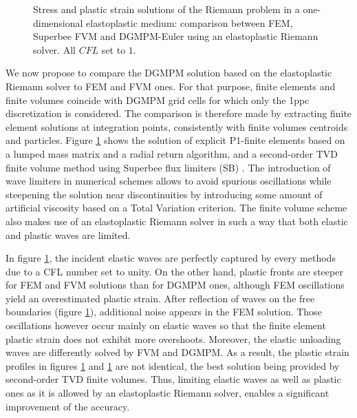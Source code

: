 \begin{figure}[h!]
  \centering
  { \label{subfig:ep_dgmpm_fvm1}}
  { \label{subfig:ep_dgmpm_fvm3}}
  {}
  \caption{Stress and plastic strain solutions of the Riemann problem in a one-dimensional elastoplastic medium: comparison between FEM, Superbee FVM and DGMPM-Euler using an elastoplastic Riemann solver. All $CFL$ set to $1$.}
  \label{fig:RP_EP_dgmpm_fvm}
\end{figure}


We now propose to compare the DGMPM solution based on the elastoplastic Riemann solver to FEM and FVM ones.
For that purpose, finite elements and finite volumes coincide with DGMPM grid cells for which only the 1ppc discretization is considered.
The comparison is therefore made by extracting finite element solutions at integration points, consistently with finite volumes centroids and particles.
Figure \ref{fig:RP_EP_dgmpm_fvm} shows the solution of explicit P1-finite elements based on a lumped mass matrix and a radial return algorithm, and a second-order TVD finite volume method using Superbee flux limiters (SB) \cite{Thomas_EP}.
The introduction of wave limiters in numerical schemes allows to avoid spurious oscillations while steepening the solution near discontinuities by introducing some amount of artificial viscosity based on a Total Variation criterion.
The finite volume scheme also makes use of an elastoplastic Riemann solver in such a way that both elastic and plastic waves are limited.

In figure \ref{fig:RP_EP_dgmpm_fvm}, the incident elastic waves are perfectly captured by every methods due to a CFL number set to unity.
On the other hand, plastic fronts are steeper for FEM and FVM solutions than for DGMPM ones, although FEM oscillations yield an overestimated plastic strain. 
After reflection of waves on the free boundaries (figure \ref{fig:RP_EP_dgmpm_fvm}), additional noise appears in the FEM solution.
Those oscillations however occur mainly on elastic waves so that the finite element plastic strain does not exhibit more overshoots.
Moreover, the elastic unloading waves are differently solved by FVM and DGMPM.
As a result, the plastic strain profiles in figures \ref{fig:RP_EP_dgmpm_fvm} and \ref{fig:RP_EP_dgmpm_fvm} are not identical, the best solution being provided by second-order TVD finite volumes. %
Thus, limiting elastic waves as well as plastic ones as it is allowed by an elastoplastic Riemann solver, enables a significant improvement of the accuracy.

